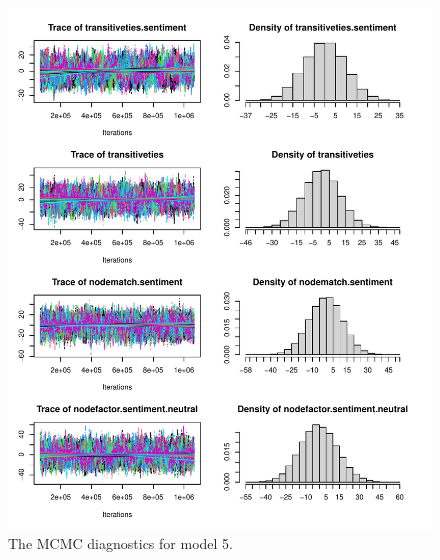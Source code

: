 \documentclass[
  man,floatsintext]{apa6}
\begin{document}
\begin{figure}[H]

{\centering \includegraphics{SNA4DS_Report_files/figure-latex/mcmc-diagnostics-1} 

}

\caption{The MCMC diagnostics for model 5.}\label{fig:mcmc-diagnostics-1}
\end{figure}
\end{document}

